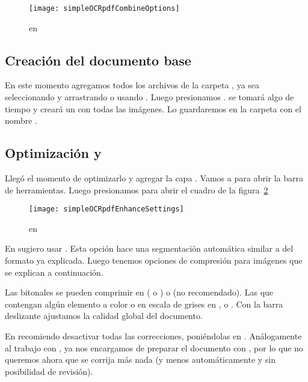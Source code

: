\documentclass[%
	a5paper,
	10pt,
	twoside,
	openright,
	final,
]{memoir}
\begin{document}
{	\begin{figure}
		\centering
		\texttt{[image: simpleOCRpdfCombineOptions]}
		\caption[\texttt{Combine Files into a Single PDF\...} en \acrobat]{ en \acrobat\label{fig:simpleOCRpdfCombineOptions}}
	\end{figure}

	\subsection{Creación del documento base} En este momento agregamos todos los archivos de la carpeta , ya sea seleccionando y arrastrando o usando . Luego presionamos . \acrobat se tomará algo de tiempo y creará un \pdf con todas las imágenes. Lo guardaremos en la carpeta  con el nombre .

	\subsection{Optimización y \texorpdfstring{\ocr}{OCR}} Llegó el momento de optimizarlo y agregar la capa \ocr. Vamos a  para abrir la barra de herramientas. Luego presionamos  para abrir el cuadro de la figura~\ref{fig:simpleOCRpdfEnhanceSettings}

	\begin{figure}
		\texttt{[image: simpleOCRpdfEnhanceSettings]}
		\caption[\texttt{Enhance Scanned PDF >\ Settings} en \acrobat]{ en \acrobat\label{fig:simpleOCRpdfEnhanceSettings}}
	\end{figure}

	En  sugiero usar . Esta opción hace una segmentación automática similar a del formato \djvu ya explicada. Luego tenemos opciones de compresión para imágenes que se explican a continuación.

	Las bitonales se pueden comprimir en  ( o ) o  (no recomendado). Las que contengan algún elemento a color o en escala de grises en ,  o . Con la barra deslizante ajustamos la calidad global del documento.

	En  recomiendo desactivar todas las correcciones, poniéndolas en . Análogamente al trabajo con \abbyy, ya nos encargamos de preparar el documento con \scantailor, por lo que no queremos ahora que se corrija más nada (y menos automáticamente y sin posibilidad de revisión).

}
\end{document}
